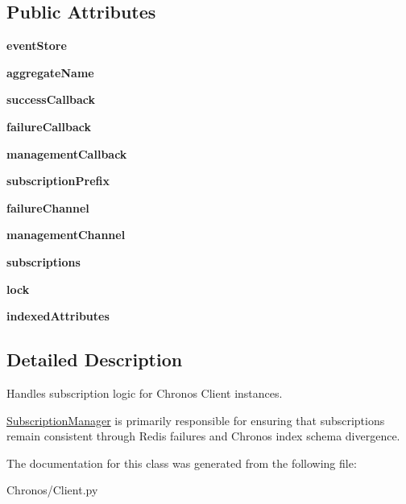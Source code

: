 \subsection*{Public Attributes}
\begin{DoxyCompactItemize}
\item 
{\bfseries event\+Store}
\item 
{\bfseries aggregate\+Name}
\item 
{\bfseries success\+Callback}
\item 
{\bfseries failure\+Callback}
\item 
{\bfseries management\+Callback}
\item 
{\bfseries subscription\+Prefix}
\item 
{\bfseries failure\+Channel}
\item 
{\bfseries management\+Channel}
\item 
{\bfseries subscriptions}
\item 
{\bfseries lock}
\item 
{\bfseries indexed\+Attributes}
\end{DoxyCompactItemize}


\subsection{Detailed Description}
Handles subscription logic for Chronos Client instances. 

\hyperlink{classChronos_1_1Client_1_1SubscriptionManager}{Subscription\+Manager} is primarily responsible for ensuring that subscriptions remain consistent through Redis failures and Chronos index schema divergence. 

The documentation for this class was generated from the following file\+:\begin{DoxyCompactItemize}
\item 
Chronos/Client.\+py\end{DoxyCompactItemize}
